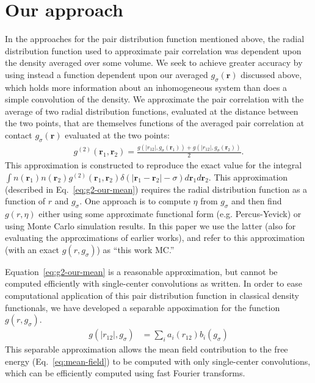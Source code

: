 \documentclass[letterpaper,twocolumn,amsmath,amssymb,pre,aps,10pt]{revtex4-1}
\newcommand{\rr}{\textbf{r}}
\begin{document}
\section{Our approach}
In the approaches for the pair distribution function mentioned above,
the radial distribution function used to approximate pair correlation
was dependent upon the density averaged over some volume.  We seek to
achieve greater accuracy by using instead a function dependent upon
our averaged $g_{\sigma}(\rr)$ discussed above, which holds more
information about an inhomogeneous system than does a simple
convolution of the density.
%
We approximate the pair correlation with the average of two radial
distribution functions, evaluated at the distance between the two
points, that are themselves functions of the averaged pair correlation
at contact $g_{\sigma}(\rr)$ evaluated at the two points:
%
\begin{align}
  g^{(2)}(\rr_1,\rr_2) = \frac{g(|r_{12}|, g_\sigma(\rr_1)) +
    g(|r_{12}|, g_\sigma(\rr_2))}{2}. \label{eq:g2-our-mean}
\end{align}
This approximation is constructed to reproduce the exact value for the
integral$ \int n(\rr_1)n(\rr_2)
g^{(2)}(\rr_1,\rr_2)\delta(|\rr_1-\rr_2|-\sigma)d\rr_1d\rr_2$.  This
approximation (described in Eq.~\ref{eq:g2-our-mean}) requires the
radial distribution function as a function of $r$ and $g_\sigma$.  One
approach is to compute $\eta$ from $g_\sigma$ and then find
$g(r,\eta)$ either using some approximate functional form
(e.g. Percus-Yevick) or using Monte Carlo simulation results.  In this
paper we use the latter (also for evaluating the approximations of
earlier works), and refer to this approximation (with an exact
$g(r,g_\sigma)$) as ``this work MC.''

Equation~\ref{eq:g2-our-mean} is a reasonable approximation, but
cannot be computed efficiently with single-center convolutions as
written.  In order to ease computational application of this pair
distribution function in classical density functionals, we have
developed a separable appoximation for the function $g(r,g_\sigma)$.
\begin{align}
  g(|r_{12}|, g_\sigma) &= \sum_{i} a_i(r_{12}) b_i(g_\sigma)
\end{align}
This separable approximation allows the mean field contribution to
the free energy (Eq.~\ref{eq:mean-field}) to be computed with only
single-center convolutions, which can be efficiently computed using
fast Fourier transforms.
\end{document}
